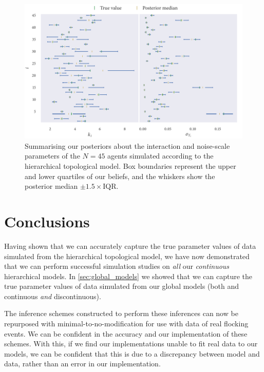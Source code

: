 \begin{figure}[tbp]
  \includegraphics{top_hier_summary.pdf}
  \caption{Summarising our posteriors about the interaction and
    noise-scale parameters of the $N=45$ agents simulated according to the
    hierarchical topological model. Box boundaries represent the upper and
    lower quartiles of our beliefs, and the whiskers show the posterior
    median $\pm1.5\times\text{IQR}$.}
  \label{fig:top_hier_summary}
\end{figure}

\section*{Conclusions}

Having shown that we can accurately capture the true parameter values of data
simulated from the hierarchical topological model, we have now demonstrated
that we can perform successful simulation studies on \emph{all} our
\emph{continuous} hierarchical models. In \cref{sec:global_models} we showed
that we can capture the true parameter values of data simulated from our global
models (both and continuous \emph{and} discontinuous).

The inference schemes constructed to perform these inferences can now be
repurposed with minimal-to-no-modification for use with data of real flocking
events. We can be confident in the accuracy and our implementation of these
schemes. With this, if we find our implementations unable to fit real data to
our models, we can be confident that this is due to a discrepancy between model
and data, rather than an error in our implementation.
